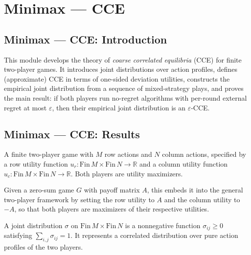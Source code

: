 \section{Minimax --- CCE}
\subsection*{Minimax --- CCE: Introduction}

This module develops the theory of \emph{coarse correlated equilibria} (CCE)
for finite two-player games.  It introduces joint distributions over action
profiles, defines (approximate) CCE in terms of one-sided deviation utilities,
constructs the empirical joint distribution from a sequence of mixed-strategy
plays, and proves the main result: if both players run no-regret algorithms
with per-round external regret at most $\varepsilon$, then their empirical
joint distribution is an $\varepsilon$-CCE.

\subsection*{Minimax --- CCE: Results}

\begin{definition}
\label{Game}
\leanok
A finite two-player game with $M$ row actions and $N$ column actions, specified
by a row utility function $u_r : \mathrm{Fin}\,M \times \mathrm{Fin}\,N \to \mathbb{R}$
and a column utility function $u_c : \mathrm{Fin}\,M \times \mathrm{Fin}\,N \to \mathbb{R}$.
Both players are utility maximizers.
\end{definition}

\begin{definition}
\label{ZeroSumGame.toGame}
\leanok
{}
Given a zero-sum game $G$ with payoff matrix $A$, this embeds it into the
general two-player framework by setting the row utility to $A$ and the column
utility to $-A$, so that both players are maximizers of their respective
utilities.
\end{definition}

\begin{definition}
\label{JointDistribution}
\leanok
A joint distribution $\sigma$ on $\mathrm{Fin}\,M \times \mathrm{Fin}\,N$ is a
nonnegative function $\sigma_{ij} \ge 0$ satisfying
$\sum_{i,j} \sigma_{ij} = 1$.  It represents a correlated distribution over
pure action profiles of the two players.
\end{definition}

